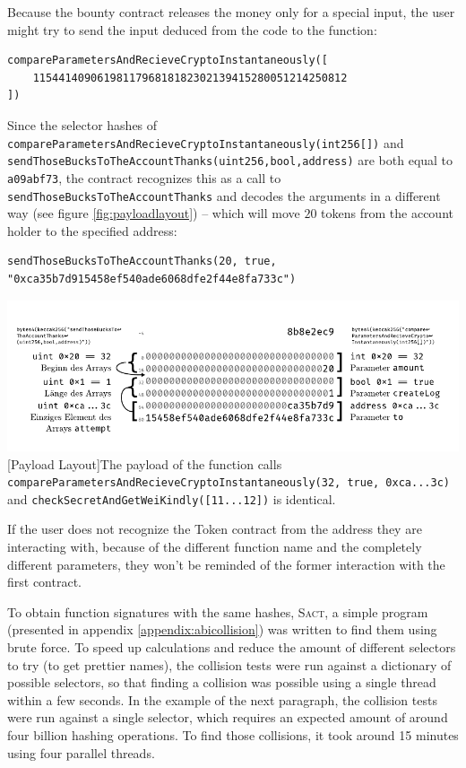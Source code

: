 Because the bounty contract releases the money only for a special input, the user might try to send the input deduced from the code to the function:
\begin{verbatim}
compareParametersAndRecieveCryptoInstantaneously([
    1154414090619811796818182302139415280051214250812
])
\end{verbatim}

Since the selector hashes of \texttt{compareParametersAndRecieveCryptoInstantaneously(int256[])} and \texttt{sendThoseBucksToTheAccountThanks(uint256,bool,address)} are both equal to \texttt{a09abf73}, the contract recognizes this as a call to \texttt{send\-Those\-Bucks\-To\-The\-Account\-Thanks} and decodes the arguments in a different way (see figure \ref{fig:payloadlayout}) -- which will move \( 20 \) tokens from the account holder to the specified address:
\begin{verbatim}
sendThoseBucksToTheAccountThanks(20, true, "0xca35b7d915458ef540ade6068dfe2f44e8fa733c")
\end{verbatim}

\vspace{1em}
\begin{minipage}{\linewidth}
	\centering
	\includegraphics[scale=1.0]{img/abi/calldatalayout.pdf}
	[Payload Layout]{The payload of the function calls \texttt{compareParametersAndRecieveCrypto\-In\-stan\-taneous\-ly(32, true, 0xca...3c)} and \texttt{checkSecretAndGetWeiKindly([11...12])} is identical.}
	\label{fig:payloadlayout}
\end{minipage}

If the user does not recognize the Token contract from the address they are interacting with, because of the different function name and the completely different parameters, they won't be reminded of the former interaction with the first contract.

To obtain function signatures with the same hashes, \textsc{Sact}, a simple program (presented in appendix \ref{appendix:abicollision}) was written to find them using brute force. To speed up calculations and reduce the amount of different selectors to try (to get prettier names), the collision tests were run against a dictionary of possible selectors, so that finding a collision was possible using a single thread within a few seconds. In the example of the next paragraph, the collision tests were run against a single selector, which requires an expected amount of around four billion hashing operations. To find those collisions, it took around 15 minutes using four parallel threads.

